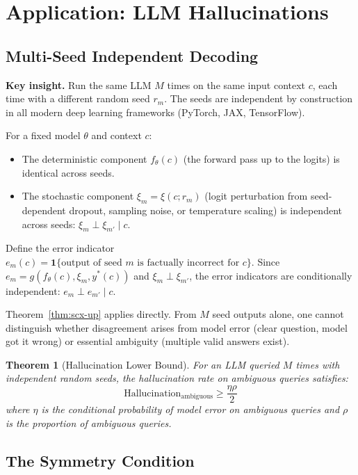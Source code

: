 \documentclass[12pt,a4paper]{article}
\newtheorem{theorem}{Theorem}[section]
\theoremstyle{definition}
\theoremstyle{remark}
\begin{document}
\section{Application: LLM Hallucinations}

\subsection{Multi-Seed Independent Decoding}

\textbf{Key insight.} Run the same LLM $M$ times on the same input context $c$, each time with a different random seed $r_m$. The seeds are independent by construction in all modern deep learning frameworks (PyTorch, JAX, TensorFlow).

For a fixed model $\theta$ and context $c$:
\begin{itemize}
\item The deterministic component $f_\theta(c)$ (the forward pass up to the logits) is identical across seeds.
\item The stochastic component $\xi_m = \xi(c; r_m)$ (logit perturbation from seed-dependent dropout, sampling noise, or temperature scaling) is independent across seeds: $\xi_m \perp \xi_{m'} \mid c$.
\end{itemize}

Define the error indicator $e_m(c) = \mathbf{1}\{\text{output of seed } m \text{ is factually incorrect for } c\}$. Since $e_m = g(f_\theta(c), \xi_m, y^*(c))$ and $\xi_m \perp \xi_{m'}$, the error indicators are conditionally independent: $e_m \perp e_{m'} \mid c$.

Theorem~\ref{thm:scx-up} applies directly. From $M$ seed outputs alone, one cannot distinguish whether disagreement arises from model error (clear question, model got it wrong) or essential ambiguity (multiple valid answers exist).

\begin{theorem}[Hallucination Lower Bound]
\label{thm:hallucination}
For an LLM queried $M$ times with independent random seeds, the hallucination rate on ambiguous queries satisfies:
\begin{equation}
\text{Hallucination}_{\text{ambiguous}} \geq \frac{\eta\rho}{2}
\end{equation}
where $\eta$ is the conditional probability of model error on ambiguous queries and $\rho$ is the proportion of ambiguous queries.
\end{theorem}

\subsection{The Symmetry Condition}
\end{document}
